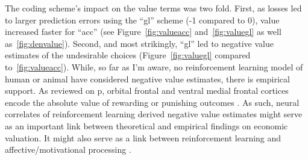 The coding scheme's impact on the value terms was two fold.  First, as losses led to larger prediction errors using the ``gl'' scheme (-1 compared to 0), value increased faster for ``acc'' (see Figure~\ref{fig:valueacc} and~\ref{fig:valuegl} as well as~\ref{fig:denvalue}).  Second, and most strikingly, ``gl'' led to negative value estimates of the undesirable choices (Figure~\ref{fig:valuegl} compared to~\ref{fig:valueacc}).  While, so far as I'm aware, no reinforcement learning model of human or animal have considered negative value estimates, there is empirical support.  As reviewed on p\pageref{subsub:fclt}, orbital frontal and ventral medial frontal cortices encode the absolute value of rewarding or punishing outcomes \citep{ODoherty:2001p2423,Hornak:2004p6234}.  As such, neural correlates of reinforcement learning derived negative value estimates might serve as an important link between theoretical and empirical findings on economic valuation.  It might also serve as a link between reinforcement learning and affective/motivational processing \citep{Knutson:2005p1627,Delgado:2004p6665}.

